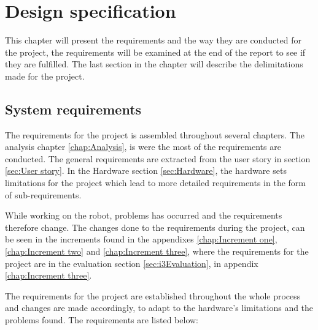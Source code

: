 \chapter{Design specification}
\label{chap:Design specification}
This chapter will present the requirements and the way they are conducted for the project, the requirements will be examined at the end of the report to see if they are fulfilled. The last section in the chapter will describe the delimitations made for the project.


\section{System requirements}
\label{sec:System requirements}
The requirements for the project is assembled throughout several chapters. The analysis chapter \ref{chap:Analysis}, is were the most of the requirements are conducted. The general requirements are extracted from the user story in section \ref{sec:User story}. In the Hardware section \ref{sec:Hardware}, the hardware sets limitations for the project which lead to more detailed requirements in the form of sub-requirements.


While working on the robot, problems has occurred and the requirements therefore change. The changes done to the requirements during the project, can be seen in the increments found in the appendixes \ref{chap:Increment one}, \ref{chap:Increment two} and \ref{chap:Increment three}, where the requirements for the project are in the evaluation section \ref{sec:i3Evaluation}, in appendix \ref{chap:Increment three}.


The requirements for the project are established throughout the whole process and changes are made accordingly, to adapt to the hardware's limitations and the problems found. The requirements are listed below: 


